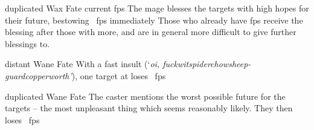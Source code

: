   {duplicated}%
  {Wax}%
  {Fate}%
  {current \glspl{fp}}%
  {The mage blesses the targets with high hopes for their future, bestowing \showDam~\glspl{fp} immediately}%
  {Those who already have \glspl{fp} receive the blessing after those with more, and are in general more difficult to give further blessings to.}

  {distant}%
  {Wane}%
  {Fate}%
  {}%
  {With a fast insult (`\textit{oi, \ifcase\value{r4}fuckwit\or spiderchow\or sheep-guard\else copperworth\fi'}), one target at \spellRange{} loses \showDam~\glspl{fp}}%
  {}

  {duplicated}%
  {Wane}%
  {Fate}%
  {}%
  {The caster mentions the worst possible future for the targets -- the most unpleasant thing which seems reasonably likely.
    They then loses \showDam~\glspl{fp}}%
  {}

